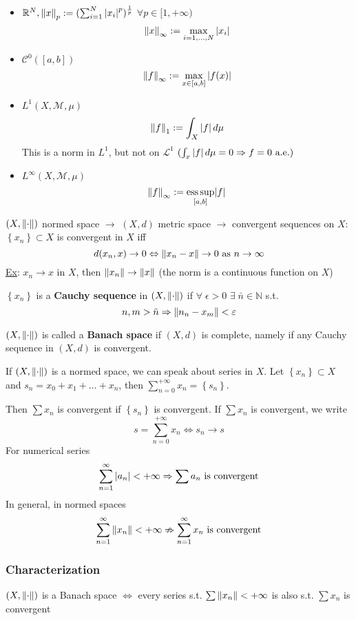 \begin{itemize}
    \item \(\mathbb{R}^N, \norm{x}_p := (\sum_{i = 1}^N \abs{x_i}^p)^{\frac{1}{p}}\) \(\forall p \in [1, +\infty)\)
    \[
        \norm{x}_{\infty} := \max_{i = 1, \ldots, N} \abs{x_i}
    \]
    \item \(\mathcal{C}^0([a,b])\) \[\norm{f}_{\infty} := \max_{x \in [a,b]} \abs{f(x)}\]
    \item \(L^1(X, \mathcal{M}, \mu)\) \[\norm{f}_1 := \int_X \abs{f} \, d\mu\] This is a norm in \(L^1\), but not on \(\mathcal{L}^1\) \((\int_x \abs{f} \, d\mu = 0 \Rightarrow f = 0 \mbox{ a.e.})\)
    \item \(L^{\infty}(X, \mathcal{M}, \mu)\) \[\norm{f}_{\infty} := \underset{[a,b]}{\text{ess}\, \text{sup}} \abs{f}\]
\end{itemize}
\((X, \norm{\cdot})\) normed space \(\to\) \((X, d)\) metric space \(\to\) convergent sequences on \(X\): \(\left\{ x_n \right\} \subset X\) is convergent in \(X\) iff 
\[
    d(x_n, x) \to 0 \Leftrightarrow \norm{x_n -x} \to 0 \mbox{ as } n \to \infty
\]
\underline{Ex}: \(x_n \to x\) in \(X\), then \(\norm{x_n} \to \norm{x}\) (the norm is a continuous function on \(X\))
\begin{definition}
    \(\left\{ x_n \right\}\) is a \textbf{Cauchy sequence} in \((X, \norm{\cdot})\) if \(\forall \; \epsilon > 0\) \(\exists \; \bar{n} \in \mathbb{N}\) s.t. 
    \[
        n,m > \bar{n} \Rightarrow \norm{n_n-x_m} < \varepsilon
    \]
\end{definition}
\begin{definition}
    \((X, \norm{\cdot})\) is called a \textbf{Banach space} if \((X, d)\) is complete, namely if any Cauchy sequence in \((X, d)\) is convergent.
\end{definition}
If \((X, \norm{\cdot})\) is a normed space, we can speak about series in \(X\). Let \(\left\{ x_n \right\} \subset X\) and \(s_n = x_0 + x_1 + \ldots + x_n\), then \(\sum_{n=0}^{+\infty} x_n = \left\{ s_n \right\}\). 

Then \(\sum x_n\) is convergent if \(\left\{ s_n \right\}\) is convergent. If \(\sum x_n\) is convergent, we write 
\[
    s = \sum_{n = 0}^{+\infty} x_n \Leftrightarrow s_n \to s
\]
For numerical series
\[
    \sum_{n=1}^{\infty} \abs{a_n} < +\infty \Rightarrow \sum a_n \mbox{ is convergent}
\]
In general, in normed spaces 
\[
    \sum_{n=1}^{\infty} \norm{x_n} < +\infty \nRightarrow \sum_{n=1}^{\infty} x_n \mbox{ is convergent}
\]
\subsubsection*{Characterization}
\((X, \norm{\cdot})\) is a Banach space \(\Leftrightarrow\) every series s.t. \(\sum \norm{x_n} < +\infty\) is also s.t. \(\sum x_n\) is convergent